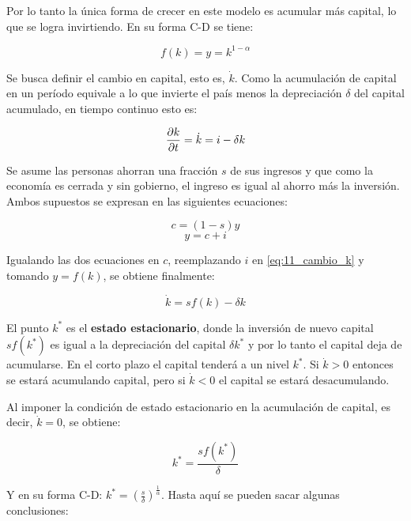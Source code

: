\documentclass[DeGregorioResumen]{subfiles}
\begin{document}
Por lo tanto la única forma de crecer en este modelo es acumular más capital, lo que se logra invirtiendo. En su forma C-D se tiene:

\begin{equation*}
f(k)=y=k^{1-\alpha}
\end{equation*}

Se busca definir el cambio en capital, esto es, $\dot{k}$. Como la acumulación de capital en un período equivale a lo que invierte el país menos la depreciación $\delta$ del capital acumulado, en tiempo continuo esto es:

\begin{equation}
\frac{\partial k}{\partial t} =\dot{k} = i-\delta k
\label{eq:11_cambio_k}
\end{equation}

Se asume las personas ahorran una fracción $s$ de sus ingresos y que como la economía es cerrada y sin gobierno, el ingreso es igual al ahorro más la inversión. Ambos supuestos se expresan en las siguientes ecuaciones:

\begin{equation*}
c=(1-s)y
\end{equation*}
\begin{equation*}
y=c+i
\end{equation*}

Igualando las dos ecuaciones en $c$, reemplazando $i$ en \eqref{eq:11_cambio_k} y tomando $y=f(k)$, se obtiene finalmente:

\begin{equation}
\dot{k}=s f(k) - \delta k
\label{eq:11_cambio_k_2}
\end{equation}



El punto $k^*$ es el \textbf{estado estacionario}, donde la inversión de nuevo capital $sf(k^*)$ es igual a la depreciación del capital $\delta k^*$ y por lo tanto el capital deja de acumularse. En el corto plazo el capital tenderá a un nivel $k^*$. Si $\dot{k}>0$ entonces se estará acumulando capital, pero si $\dot{k}<0$ el capital se estará desacumulando.

Al imponer la condición de estado estacionario en la acumulación de capital, es decir, $\dot{k}=0$, se obtiene:

\begin{equation}
k^*=\frac{sf(k^*)}{\delta}
\end{equation}

Y en su forma C-D: $\displaystyle k^* = \left(\frac{s}{\delta}\right)^\frac{1}{\alpha}$. Hasta aquí se pueden sacar algunas conclusiones:
\end{document}
